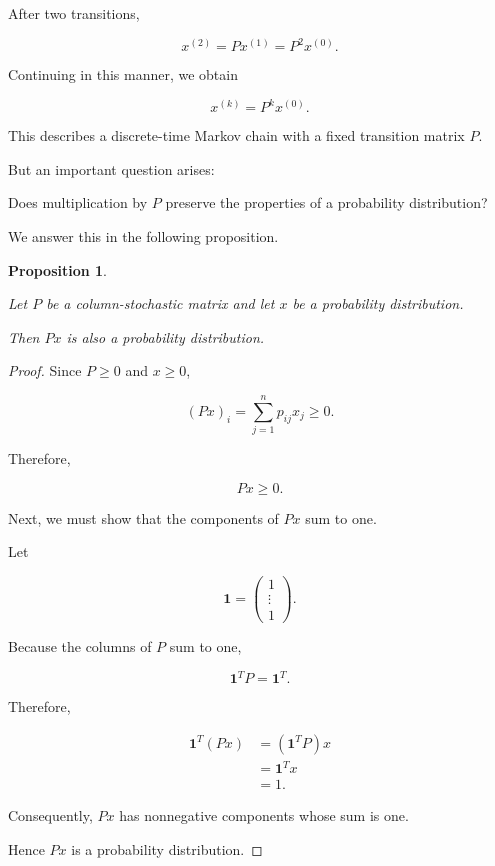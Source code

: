 \documentclass[11pt,a4paper]{article}
\newtheorem{proposition}[theorem]{Proposition}
\theoremstyle{definition}
\theoremstyle{remark}
\begin{document}
After two transitions,

\[
x^{(2)}=Px^{(1)}
       =P^2x^{(0)}.
\]

Continuing in this manner,
we obtain

\begin{equation}
\boxed{
x^{(k)}=P^kx^{(0)}.
}
\label{eq:markov_k_steps}
\end{equation}

This describes a discrete-time
Markov chain with a fixed
transition matrix $P$.

But an important question arises:

Does multiplication by $P$
preserve the properties of
a probability distribution?

We answer this in the
following proposition.

\begin{proposition}
\label{prop:stochastic_preserves_simplex}

Let $P$ be a column-stochastic
matrix and let $x$ be a
probability distribution.

Then $Px$ is also a
probability distribution.

\end{proposition}

\begin{proof}

Since $P\geq0$ and $x\geq0$,

\[
(Px)_i
=
\sum_{j=1}^{n}p_{ij}x_j
\geq0.
\]

Therefore,

\[
Px\geq0.
\]

Next, we must show that
the components of $Px$
sum to one.

Let

\[
\mathbf{1}=
\begin{pmatrix}
1\\
\vdots\\
1
\end{pmatrix}.
\]

Because the columns of $P$
sum to one,

\begin{equation}
\mathbf{1}^TP=\mathbf{1}^T.
\label{eq:stochastic_left_eigenvector}
\end{equation}

Therefore,

\[
\begin{aligned}
\mathbf{1}^T(Px)
&=(\mathbf{1}^TP)x\\
&=\mathbf{1}^Tx\\
&=1.
\end{aligned}
\]

Consequently, $Px$ has
nonnegative components
whose sum is one.

Hence $Px$ is a
probability distribution.

\end{proof}
\end{document}
